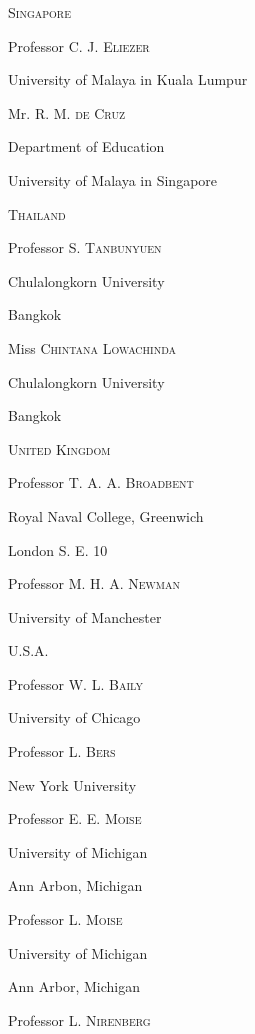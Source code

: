 \medskip
\noindent
\textsc{Singapore}

\smallskip

Professor C. J. \textsc{Eliezer}

University of Malaya in Kuala Lumpur

\bigskip

Mr. R. M. \textsc{de Cruz}

Department of Education

University of Malaya in Singapore 

\medskip
\noindent
\textsc{Thailand}

\smallskip
Professor S. \textsc{Tanbunyuen}

Chulalongkorn University 

Bangkok

\bigskip

Miss \textsc{Chintana Lowachinda}

Chulalongkorn University

Bangkok

\medskip
\noindent
\textsc{United Kingdom}

\smallskip
Professor T. A. A. \textsc{Broadbent}

Royal Naval College, Greenwich

London S. E. 10

\bigskip

Professor M. H. A. \textsc{Newman}

University of Manchester

\medskip
\noindent
\textsc{U.S.A.}

\smallskip

Professor W. L. \textsc{Baily}

University of Chicago

\bigskip

Professor L. \textsc{Bers}

New York University

\bigskip

Professor E. E. \textsc{Moise}

University of Michigan

Ann Arbon, Michigan

\bigskip

Professor L. \textsc{Moise}

University of Michigan

Ann Arbor, Michigan

\bigskip

Professor L. \textsc{Nirenberg}

